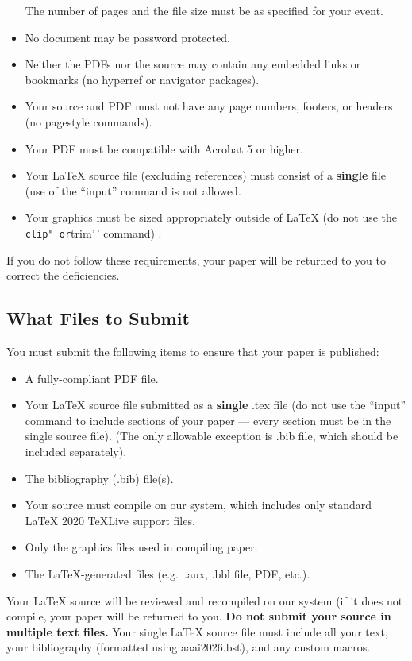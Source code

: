 \begin{itemize}
  The number of pages and the file size must be as specified for your
  event.
\item
  No document may be password protected.
\item
  Neither the PDFs nor the source may contain any embedded links or
  bookmarks (no hyperref or navigator packages).
\item
  Your source and PDF must not have any page numbers, footers, or
  headers (no pagestyle commands).
\item
  Your PDF must be compatible with Acrobat 5 or higher.
\item
  Your {\LaTeX} source file (excluding references) must consist of a
  \textbf{single} file (use of the ``input'' command is not allowed.
\item
  Your graphics must be sized appropriately outside of {\LaTeX} (do not
  use the \texttt{clip"\ or}trim'\,' command) .
\end{itemize}

If you do not follow these requirements, your paper will be returned to
you to correct the deficiencies.

\subsection{What Files to Submit}\label{what-files-to-submit}

You must submit the following items to ensure that your paper is
published:

\begin{itemize}
\tightlist
\item
  A fully-compliant PDF file.
\item
  Your {\LaTeX} source file submitted as a \textbf{single} .tex file (do
  not use the ``input'' command to include sections of your paper ---
  every section must be in the single source file). (The only allowable
  exception is .bib file, which should be included separately).
\item
  The bibliography (.bib) file(s).
\item
  Your source must compile on our system, which includes only standard
  {\LaTeX} 2020 TeXLive support files.
\item
  Only the graphics files used in compiling paper.
\item
  The {\LaTeX}-generated files (e.g.~.aux, .bbl file, PDF, etc.).
\end{itemize}

Your {\LaTeX} source will be reviewed and recompiled on our system (if
it does not compile, your paper will be returned to you. \textbf{Do not
submit your source in multiple text files.} Your single {\LaTeX} source
file must include all your text, your bibliography (formatted using
aaai2026.bst), and any custom macros.

